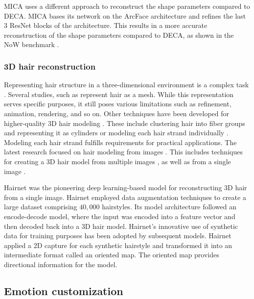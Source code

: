MICA uses a different approach to reconstruct the shape parameters compared to DECA. MICA bases its network on the ArcFace architecture \cite{dengSubcenterArcFaceBoosting2020} and refines the last 3 ResNet blocks of the architecture. This results in a more accurate reconstruction of the shape parameters compared to DECA, as shown in the NoW benchmark \cite{RingNet:CVPR:2019}.


\subsubsection{3D hair reconstruction}
Representing hair structure in a three-dimensional environment is a complex task \cite{hairsurvey}. Several studies, such as \cite{deng,facegcn,pifu,3dhmr} represent hair as a mesh. While this representation serves specific purposes, it still poses various limitations such as refinement, animation, rendering, and so on.
Other techniques have been developed for higher-quality 3D hair modeling \cite{hairsurvey}. These include clustering hair into fiber groups and representing it as cylinders \cite{cluster} or modeling each hair strand individually \cite{hairsurvey}. Modeling each hair strand fulfills requirements for practical applications.
The latest research focused on hair modeling from images \cite{imgbasesurvey}. This includes techniques for creating a 3D hair model from multiple images \cite{multihair1}, as well as from a single image \cite{hairimg1,hairimg2,hairimg4}.



Hairnet \cite{zhouHairNetSingleViewHair2018} was the pioneering deep learning-based model for reconstructing 3D hair from a single image. Hairnet employed data augmentation techniques to create a large dataset comprising $40,000$ hairstyles. Its model architecture followed an encode-decode model, where the input was encoded into a feature vector and then decoded back into a 3D hair model. Hairnet's innovative use of synthetic data for training purposes has been adopted by subsequent models. Hairnet applied a 2D capture for each synthetic hairstyle and transformed it into an intermediate format called an oriented map. The oriented map provides directional information for the model.

\subsection{Emotion customization}

